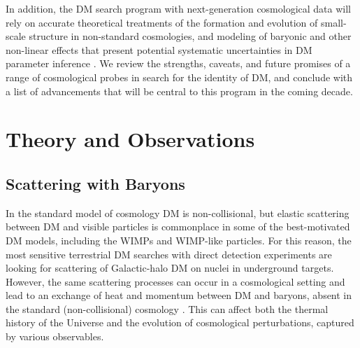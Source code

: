 \documentclass[12pt]{article}
\begin{document}
In addition, the DM search program with next-generation cosmological data will rely on accurate theoretical treatments of the formation and evolution of small-scale structure in non-standard cosmologies, and modeling of baryonic and other non-linear effects that present potential systematic uncertainties in DM parameter inference \cite{2019arXiv190201055D,2018PhRvD..98h3540M,AliHaimoud_19}.
We review the strengths, caveats, and future promises of a range of cosmological probes in search for the identity of DM, and conclude with a list of advancements that will be central to this program in the coming decade.
\vspace{-0.4cm}
\section{Theory and Observations}
\label{sec:thobs}
\vspace{-0.2cm}
\subsection{Scattering with Baryons}

In the standard model of cosmology DM is non-collisional, but elastic scattering between DM and visible particles is commonplace in some of the best-motivated DM models, including the WIMPs and WIMP-like particles.
For this reason, the most sensitive terrestrial DM searches with direct detection experiments are looking for scattering of Galactic-halo DM on nuclei in underground targets.
However, the same scattering processes can occur in a cosmological setting and lead to an exchange of heat and momentum between DM and baryons, absent in the standard (non-collisional) cosmology \cite{Boddy:2018kfv,Gluscevic:2017ywp,Boddy:2018wzy,Xu:2018efh,Slatyer:2018aqg,Dvorkin:2013cea,2001PhLB..518....8B,2005A&A...438..419B,2004NuPhB.683..219B,Sigurdson:2004zp}. 
This can affect both the thermal history of the Universe and the evolution of cosmological perturbations, captured by various observables.
\end{document}
